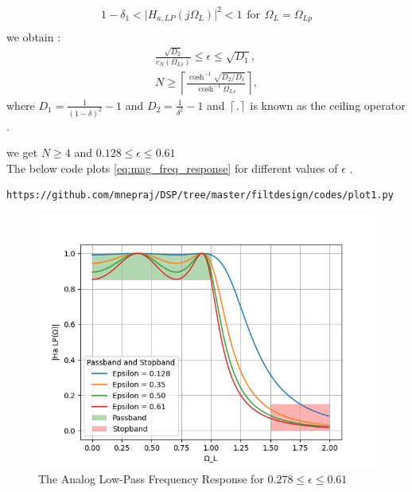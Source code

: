 \documentclass{article}
\begin{document}
\begin{enumerate}
\begin{align}
              1-\delta_{1}<\vert H_{a,LP}(j\Omega_L)\vert^2 < 1 \hspace{5pt} \text{for}\hspace{5pt} \Omega_L = \Omega_{Lp} \\
          \end{align}
          we obtain :
          \begin{eqnarray}
              \label{lpdesign}
              \frac{\sqrt{D_2}}{c_N(\Omega_{Ls})} \leq \epsilon \leq \sqrt{D_1}, \nonumber \\
              N \geq \left\lceil \frac{\cosh^{-1}\sqrt{D_2/D_1}}{\cosh^{-1}\Omega_{Ls}} \right\rceil,
          \end{eqnarray}
          where $D_1 = \frac{1}{(1 - \delta)^2}-1$ and $D_2 = \frac{1}{\delta^2} - 1$ and $\left \lceil . \right \rceil$ is known as the ceiling operator . 
          
          we get $N\geq4$ and $0.128 \leq \epsilon \leq 0.61$ \\
          \newpage
          The below code plots \eqref{eq:mag_freq_response} for different values of $\epsilon$ .
          \begin{lstlisting}
https://github.com/mnepraj/DSP/tree/master/filtdesign/codes/plot1.py
\end{lstlisting}
          \begin{figure}[H]
              \centering
              \includegraphics[width=1\columnwidth]{figs/plot1.png}
              \caption{The Analog Low-Pass Frequency Response for $0.278  \leq \epsilon \leq 0.61$}
              \label{fig:H_for_diff_eb}
          \end{figure}
          

\end{enumerate}
\end{document}
